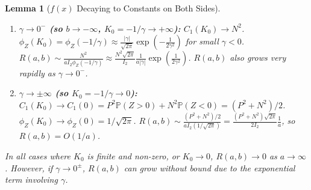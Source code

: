 \documentclass[11pt]{article}
\newtheorem{lemma}{Lemma}
\begin{document}
\begin{lemma}[$f(x)$ Decaying to Constants on Both Sides]
\begin{enumerate}
    \item \textbf{$\gamma \to 0^-$ (so $b \to -\infty$, $K_0 = -1/\gamma \to +\infty$):}
    $C_1(K_0) \to N^2$.
    $\phi_Z(K_0) = \phi_Z(-1/\gamma) \approx \frac{|\gamma|}{\sqrt{2\pi}} \exp\left(-\frac{1}{2\gamma^2}\right)$ for small $\gamma < 0$.
    $R(a,b) \sim \frac{N^2}{a I_2 \phi_Z(-1/\gamma)} \approx \frac{N^2 \sqrt{2\pi}}{I_2} \frac{1}{a|\gamma|} \exp\left(\frac{1}{2\gamma^2}\right)$.
    $R(a,b)$ also grows very rapidly as $\gamma \to 0^-$.

    \item \textbf{$\gamma \to \pm\infty$ (so $K_0 = -1/\gamma \to 0$):}
    $C_1(K_0) \to C_1(0) = P^2 \mathbb{P}(Z > 0) + N^2 \mathbb{P}(Z < 0) = (P^2+N^2)/2$.
    $\phi_Z(K_0) \to \phi_Z(0) = 1/\sqrt{2\pi}$.
    $R(a,b) \sim \frac{(P^2+N^2)/2}{a I_2 (1/\sqrt{2\pi})} = \frac{(P^2+N^2)\sqrt{2\pi}}{2 I_2} \frac{1}{a}$, so $R(a,b) = O(1/a)$.
\end{enumerate}

In all cases where $K_0$ is finite and non-zero, or $K_0 \to 0$, $R(a,b) \to 0$ as $a \to \infty$. However, if $\gamma \to 0^\pm$, $R(a,b)$ can grow without bound due to the exponential term involving $\gamma$.
\end{lemma}
\end{document}

